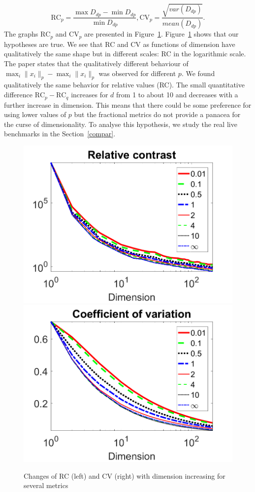 \documentclass[entropy,article,submit,moreauthors,pdftex]{Definitions/mdpi}
\begin{document}
\begin{equation*}
\text{RC}_p=\frac{\max D_{dp} - \min D_{dp}}{\min D_{dp}}, \text{CV}_p=\frac{\sqrt{var(D_{dp})}}{mean(D_{dp})} .
\end{equation*}
The graphs $\text{RC}_p$ and $\text{CV}_p$ are presented in Figure~\ref{fig:RC1}. Figure~\ref{fig:RC1} shows that our hypotheses are true. We see that RC and CV as functions of dimension have qualitatively the same shape but in different scales: RC in the logarithmic scale.
The paper \cite{aggarwal2001} states that the qualitatively different behaviour of $\max_i \|x_i\|_p-\max_i \|x_i\|_p$ was observed for different $p$. We found qualitatively the same behavior for relative values (RC). The small quantitative difference $\text{RC}_p-\text{RC}_q$ increases for $ d $ from 1 to about 10 and decreases with a further increase in dimension. This means that there could be some preference for using lower values of $p$ but the fractional metrics do not provide a panacea for the curse of dimensionality. To analyse this hypothesis, we study the real live benchmarks in the Section~\ref{compar}.

\begin{figure}[tb]
\centerline{\includegraphics[width=0.4\columnwidth ]{RelCont1.png}\includegraphics[width=0.4\columnwidth ]{CV1.png}}
\caption{Changes of RC (left) and CV (right) with dimension increasing for several metrics}
\label{fig:RC1}
\end{figure}
\end{document}
